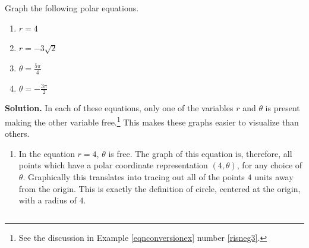 \begin{ex} \label{rthetaconstant} Graph the following polar equations.

\begin{multicols}{4}

\begin{enumerate}

\item  $r = 4$

\item  $r = -3\sqrt{2}$

\item  $\theta = \frac{5\pi}{4}$

\item  $\theta = -\frac{3\pi}{2}$

\end{enumerate}

\end{multicols}

{\bf Solution.}  In each of these equations, only one of the variables $r$ and $\theta$ is present making the other  variable free.\footnote{See the discussion in Example \ref{eqnconversionex} number \ref{risneg3}.} This makes these graphs easier to visualize than others.

\begin{enumerate}

\item  In the equation $r=4$, $\theta$ is free.  The graph of this equation is, therefore,  all points which have a polar coordinate representation $(4,\theta)$, for any choice of $\theta$.  Graphically this translates into tracing out all of the points $4$ units away from the origin.  This is exactly the definition of circle, centered at the origin, with a radius of $4$.

\begin{center}

\begin{tabular}{cc}


\end{tabular}
\end{center}
\end{enumerate}
\end{ex}
